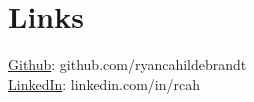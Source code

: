 \documentclass[letterpaper]{deedy-resume_sm} %
\begin{document}
\section{Links} 
\href{https://github.com/ryancahildebrandt}{Github}: github.com/ryancahildebrandt \\
\href{https://linkedin.com/in/rcah}{LinkedIn}: linkedin.com/in/rcah \\
\hfill



\end{document}
